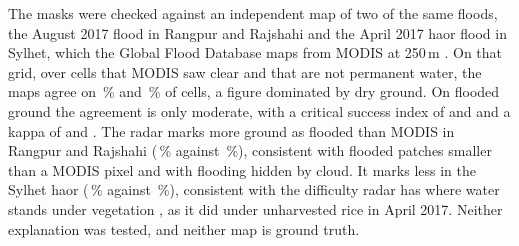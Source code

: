 \documentclass[10pt,a4paper,twocolumn]{article}
\begin{document}
The masks were checked against an independent map of two of the same floods, the August 2017 flood in Rangpur and Rajshahi and the April 2017 haor flood in Sylhet, which the Global Flood Database maps from MODIS at 250\,m \citep{tellman2021}. On that grid, over cells that MODIS saw clear and that are not permanent water, the maps agree on \RRXcAgree{}\,\% and \SylhetXcAgree{}\,\% of cells, a figure dominated by dry ground. On flooded ground the agreement is only moderate, with a critical success index of \RRXcCSI{} and \SylhetXcCSI{} and a kappa of \RRXcKappa{} and \SylhetXcKappa{}. The radar marks more ground as flooded than MODIS in Rangpur and Rajshahi (\RRXcSOneShare{}\,\% against \RRXcGfdShare{}\,\%), consistent with flooded patches smaller than a MODIS pixel and with flooding hidden by cloud. It marks less in the Sylhet haor (\SylhetXcSOneShare{}\,\% against \SylhetXcGfdShare{}\,\%), consistent with the difficulty radar has where water stands under vegetation \citep{amitrano2024}, as it did under unharvested rice in April 2017. Neither explanation was tested, and neither map is ground truth.
\end{document}
